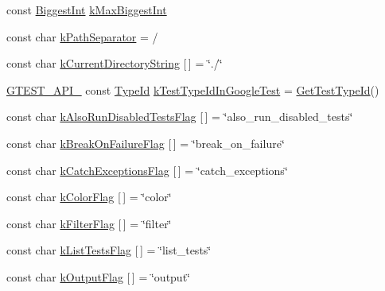 \begin{DoxyCompactItemize}
\item 
const \hyperlink{namespacetesting_1_1internal_a05c6bd9ede5ccdf25191a590d610dcc6}{Biggest\+Int} \hyperlink{namespacetesting_1_1internal_ad901880198832bc166d2493096b451f7}{k\+Max\+Biggest\+Int}
\item 
const char \hyperlink{namespacetesting_1_1internal_afcd71adaa9d1e6df7b282a17fc48125c}{k\+Path\+Separator} = \textquotesingle{}/\textquotesingle{}
\item 
const char \hyperlink{namespacetesting_1_1internal_a23a8e9527d0e544e7df2d64ad549ce3e}{k\+Current\+Directory\+String} \mbox{[}$\,$\mbox{]} = \char`\"{}./\char`\"{}
\item 
\hyperlink{gtest-port_8h_aa73be6f0ba4a7456180a94904ce17790}{G\+T\+E\+S\+T\+\_\+\+A\+P\+I\+\_\+} const \hyperlink{namespacetesting_1_1internal_ab1114197d3c657d8b7f8e0c5caa12d00}{Type\+Id} \hyperlink{namespacetesting_1_1internal_acac7993efabbd9dd62c1e9c7d143a72f}{k\+Test\+Type\+Id\+In\+Google\+Test} = \hyperlink{namespacetesting_1_1internal_ad0d66d56ead224263cd100c1d6bfc562}{Get\+Test\+Type\+Id}()
\item 
const char \hyperlink{namespacetesting_1_1internal_ad5882ed0ceadc0f23090f0f08b5d495b}{k\+Also\+Run\+Disabled\+Tests\+Flag} \mbox{[}$\,$\mbox{]} = \char`\"{}also\+\_\+run\+\_\+disabled\+\_\+tests\char`\"{}
\item 
const char \hyperlink{namespacetesting_1_1internal_a804c907155bfee3a6616ae3ca04048d0}{k\+Break\+On\+Failure\+Flag} \mbox{[}$\,$\mbox{]} = \char`\"{}break\+\_\+on\+\_\+failure\char`\"{}
\item 
const char \hyperlink{namespacetesting_1_1internal_af4bb309802e83df0927097e6e4201a38}{k\+Catch\+Exceptions\+Flag} \mbox{[}$\,$\mbox{]} = \char`\"{}catch\+\_\+exceptions\char`\"{}
\item 
const char \hyperlink{namespacetesting_1_1internal_a884ff13b75232fbe7daa0caf46f1de66}{k\+Color\+Flag} \mbox{[}$\,$\mbox{]} = \char`\"{}color\char`\"{}
\item 
const char \hyperlink{namespacetesting_1_1internal_a8cb8ee7fe7659e6916a0108dffa2f7dc}{k\+Filter\+Flag} \mbox{[}$\,$\mbox{]} = \char`\"{}filter\char`\"{}
\item 
const char \hyperlink{namespacetesting_1_1internal_a1d3cfebffefbf35f7033d4941493a8ff}{k\+List\+Tests\+Flag} \mbox{[}$\,$\mbox{]} = \char`\"{}list\+\_\+tests\char`\"{}
\item 
const char \hyperlink{namespacetesting_1_1internal_abd5368e00a31d175c6696cf76cbbde10}{k\+Output\+Flag} \mbox{[}$\,$\mbox{]} = \char`\"{}output\char`\"{}

\end{DoxyCompactItemize}
